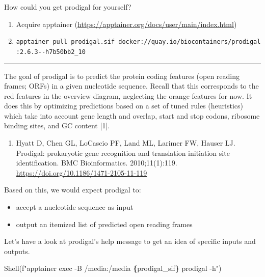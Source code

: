 \documentclass[
]{book}
\newenvironment{Shaded}{\begin{snugshade}}{\end{snugshade}}
\newcommand{\NormalTok}[1]{#1}
\newcommand{\SpecialCharTok}[1]{\textcolor[rgb]{0.81,0.36,0.00}{\textbf{#1}}}
\newcommand{\SpecialStringTok}[1]{\textcolor[rgb]{0.31,0.60,0.02}{#1}}
\providecommand{\tightlist}{%
  \setlength{\itemsep}{0pt}\setlength{\parskip}{0pt}}
\begin{document}
How could you get prodigal for yourself?

\begin{enumerate}
\def\labelenumi{\arabic{enumi}.}
\tightlist
\item
  Acquire apptainer (\url{https://apptainer.org/docs/user/main/index.html})
\item
  \texttt{apptainer\ pull\ prodigal.sif\ docker://quay.io/biocontainers/prodigal:2.6.3-\/-h7b50bb2\_10}
\end{enumerate}

\begin{center}\rule{0.5\linewidth}{0.5pt}\end{center}

The goal of prodigal is to predict the protein coding features (open reading frames; ORFs) in a given nucleotide sequence.
Recall that this corresponds to the red features in the overview diagram, neglecting the orange features for now.
It does this by optimizing predictions based on a set of tuned rules (heuristics) which take into account
gene length and overlap, start and stop codons, ribosome binding sites, and GC content {[}1{]}.

\begin{enumerate}
\def\labelenumi{\arabic{enumi}.}
\tightlist
\item
  Hyatt D, Chen GL, LoCascio PF, Land ML, Larimer FW, Hauser LJ. Prodigal: prokaryotic gene recognition and translation initiation site identification. BMC Bioinformatics. 2010;11(1):119. \url{https://doi.org/10.1186/1471-2105-11-119}
\end{enumerate}

Based on this, we would expect prodigal to:

\begin{itemize}
\tightlist
\item
  accept a nucleotide sequence as input
\item
  output an itemized list of predicted open reading frames
\end{itemize}

Let's have a look at prodigal's help message to get an idea of specific inputs and outputs.

\begin{Shaded}
\begin{Highlighting}[numbers=left,,]
\NormalTok{Shell(}\SpecialStringTok{f"apptainer exec {-}B /media:/media }\SpecialCharTok{\{}\NormalTok{prodigal\_sif}\SpecialCharTok{\}}\SpecialStringTok{ prodigal {-}h"}\NormalTok{)}
\end{Highlighting}
\end{Shaded}
\end{document}
